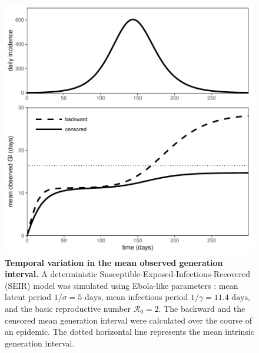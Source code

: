 \documentclass[12pt]{article}
\newcommand{\RR}{\ensuremath{{\mathcal R}}}
\begin{document}
\begin{figure}[!pbth]
\includegraphics[width=\textwidth]{../fig/temporal_effect.pdf}
\caption{\textbf{Temporal variation in the mean observed generation interval.}
A deterministic Susceptible-Exposed-Infectious-Recovered (SEIR) model was simulated using Ebola-like parameters \citep{who2014ebola}: mean latent period $1/\sigma = 5 \textrm{ days}$, mean infectious period $1/\gamma = 11.4 \textrm{ days}$, and the basic reproductive number $\RR_0 = 2$. 
The backward and the censored mean generation interval were calculated over the course of an epidemic.
The dotted horizontal line represents the mean intrinsic generation interval.
}
\label{fig:censor}
\end{figure}
\end{document}
